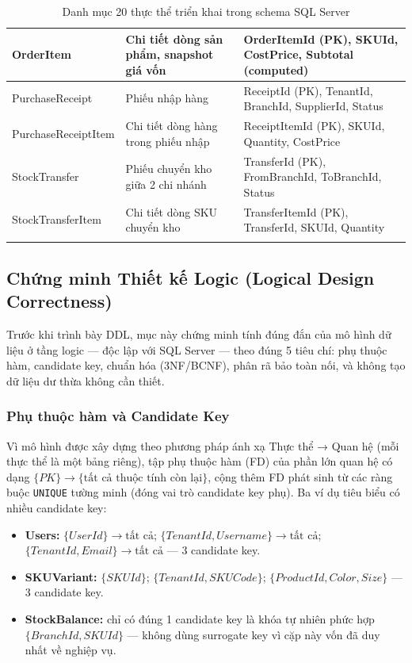 \begin{longtable}{|p{3.4cm}|p{5.5cm}|p{5cm}|}
    \hline
    OrderItem & Chi tiết dòng sản phẩm, snapshot giá vốn & OrderItemId (PK), SKUId, CostPrice, Subtotal (computed) \\
    \hline
    PurchaseReceipt & Phiếu nhập hàng & ReceiptId (PK), TenantId, BranchId, SupplierId, Status \\
    \hline
    PurchaseReceiptItem & Chi tiết dòng hàng trong phiếu nhập & ReceiptItemId (PK), SKUId, Quantity, CostPrice \\
    \hline
    StockTransfer & Phiếu chuyển kho giữa 2 chi nhánh & TransferId (PK), FromBranchId, ToBranchId, Status \\
    \hline
    StockTransferItem & Chi tiết dòng SKU chuyển kho & TransferItemId (PK), TransferId, SKUId, Quantity \\
    \hline
    \caption{Danh mục 20 thực thể triển khai trong schema SQL Server}
    \label{tab:entity-catalog}
\end{longtable}

\subsection{Chứng minh Thiết kế Logic (Logical Design Correctness)}
\label{sec:logical-design}

Trước khi trình bày DDL, mục này chứng minh tính đúng đắn của mô hình dữ liệu ở tầng logic — độc lập với SQL Server — theo đúng 5 tiêu chí: phụ thuộc hàm, candidate key, chuẩn hóa (3NF/BCNF), phân rã bảo toàn nối, và không tạo dữ liệu dư thừa không cần thiết.

\subsubsection{Phụ thuộc hàm và Candidate Key}
Vì mô hình được xây dựng theo phương pháp ánh xạ Thực thể → Quan hệ (mỗi thực thể là một bảng riêng), tập phụ thuộc hàm (FD) của phần lớn quan hệ có dạng \(\{PK\} \rightarrow \{\text{tất cả thuộc tính còn lại}\}\), cộng thêm FD phát sinh từ các ràng buộc \texttt{UNIQUE} tường minh (đóng vai trò candidate key phụ). Ba ví dụ tiêu biểu có nhiều candidate key:

\begin{itemize}
    \item \textbf{Users:} \(\{UserId\} \rightarrow \text{tất cả}\); \(\{TenantId, Username\} \rightarrow \text{tất cả}\); \(\{TenantId, Email\} \rightarrow \text{tất cả}\) — 3 candidate key.
    \item \textbf{SKUVariant:} \(\{SKUId\}\); \(\{TenantId, SKUCode\}\); \(\{ProductId, Color, Size\}\) — 3 candidate key.
    \item \textbf{StockBalance:} chỉ có đúng 1 candidate key là khóa tự nhiên phức hợp \(\{BranchId, SKUId\}\) — không dùng surrogate key vì cặp này vốn đã duy nhất về nghiệp vụ.
\end{itemize}

